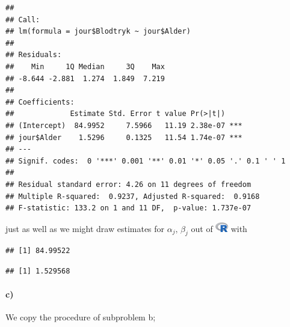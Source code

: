 \documentclass[
]{article}
\newenvironment{Shaded}{\begin{snugshade}}{\end{snugshade}}
\newcommand{\DecValTok}[1]{\textcolor[rgb]{0.00,0.00,0.81}{#1}}
\newcommand{\KeywordTok}[1]{\textcolor[rgb]{0.13,0.29,0.53}{\textbf{#1}}}
\newcommand{\NormalTok}[1]{#1}
\newcommand{\OperatorTok}[1]{\textcolor[rgb]{0.81,0.36,0.00}{\textbf{#1}}}
\newcommand{\StringTok}[1]{\textcolor[rgb]{0.31,0.60,0.02}{#1}}
\begin{document}
\begin{verbatim}
## 
## Call:
## lm(formula = jour$Blodtryk ~ jour$Alder)
## 
## Residuals:
##    Min     1Q Median     3Q    Max 
## -8.644 -2.881  1.274  1.849  7.219 
## 
## Coefficients:
##             Estimate Std. Error t value Pr(>|t|)    
## (Intercept)  84.9952     7.5966   11.19 2.38e-07 ***
## jour$Alder    1.5296     0.1325   11.54 1.74e-07 ***
## ---
## Signif. codes:  0 '***' 0.001 '**' 0.01 '*' 0.05 '.' 0.1 ' ' 1
## 
## Residual standard error: 4.26 on 11 degrees of freedom
## Multiple R-squared:  0.9237, Adjusted R-squared:  0.9168 
## F-statistic: 133.2 on 1 and 11 DF,  p-value: 1.737e-07
\end{verbatim}

just as well as we might draw estimates for \(\alpha_{j},\,\beta_j\) out
of \includegraphics[width=\textwidth,height=0.16667in]{R_logo.png} with

\begin{Shaded}
\end{Shaded}

\begin{verbatim}
## [1] 84.99522
\end{verbatim}

\begin{Shaded}
\end{Shaded}

\begin{verbatim}
## [1] 1.529568
\end{verbatim}

\hypertarget{c-1}{%
\paragraph{\texorpdfstring{\textbf{c)}}{c)}}\label{c-1}}

We copy the procedure of subproblem b;

\begin{Shaded}
\end{Shaded}
\end{document}

